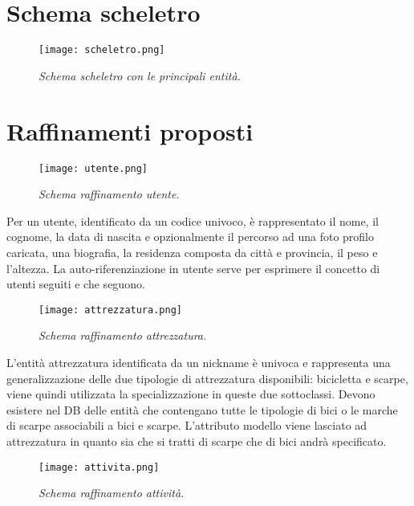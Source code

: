 \documentclass[12pt]{report}
\begin{document}
\section{Schema scheletro}

\begin{figure}[H]
    \texttt{[image: scheletro.png]}
    \centering
    \caption{\emph{Schema scheletro con le principali entità.}}
    \label{img:schema_scheletro}
\end{figure}

\section{Raffinamenti proposti}

\begin{figure}[H]
    \texttt{[image: utente.png]}
    \centering
    \caption{\emph{Schema raffinamento utente.}}
    \label{img:schema_utente}
\end{figure}

Per un utente, identificato da un codice univoco, è rappresentato il nome, il cognome,
la data di nascita e opzionalmente il percorso ad una foto profilo caricata, una biografia,
la residenza composta da città e provincia, il peso e l'altezza.
La auto-riferenziazione in utente serve per esprimere il concetto di utenti seguiti e che seguono.

\begin{figure}[H]
    \texttt{[image: attrezzatura.png]}
    \centering
    \caption{\emph{Schema raffinamento attrezzatura.}}
    \label{img:schema_attrezzatura}
\end{figure}

L'entità attrezzatura identificata da un nickname è univoca e rappresenta una generalizzazione delle due tipologie 
di attrezzatura disponibili: bicicletta e scarpe, viene quindi utilizzata la specializzazione in queste due sottoclassi. 
Devono esistere nel DB delle entità che contengano tutte le tipologie di bici o le marche di scarpe associabili a bici 
e scarpe. L'attributo modello viene lasciato ad attrezzatura in quanto sia che si tratti di scarpe che di bici andrà specificato.

\begin{figure}[H]
    \texttt{[image: attivita.png]}
    \centering
    \caption{\emph{Schema raffinamento attività.}}
    \label{img:schema_attivita}
\end{figure}
\end{document}
